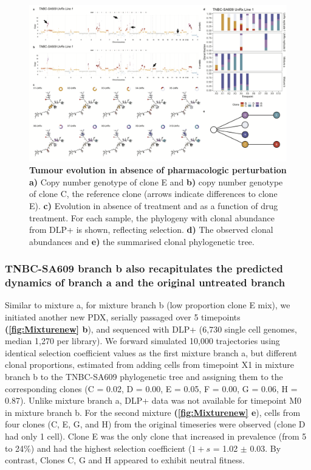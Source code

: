 \begin{figure}
\centering
\includegraphics[width=\textwidth]{Figures/chap4/genePlotsa609mix.png}
	
\caption[Tumour evolution in absence of pharmacologic perturbation]
	{\small
	\textbf{Tumour evolution in absence of pharmacologic perturbation}
	    \textbf{a)} Copy number genotype of clone E and \textbf{b)} copy number genotype of clone C, the reference clone (arrows indicate differences to clone E).  
	    \textbf{c)} Evolution in absence of treatment and as a function of drug treatment. For each sample, the phylogeny with clonal abundance from DLP+ is shown, reflecting selection. \textbf{d)} The observed clonal abundances and \textbf{e)} the summarised clonal phylogenetic tree.}
	\label{fig:genotype609mix}
\end{figure}


\subsubsection{TNBC-SA609 branch b also recapitulates the predicted dynamics of branch a and the original untreated branch}

Similar to mixture a, for mixture branch b (low proportion clone E mix), we initiated another new PDX, serially passaged over 5 timepoints \textbf{(\autoref{fig:Mixturenew} b}), and sequenced with DLP+  (6,730 single cell genomes, median 1,270 per library).
We forward simulated 10,000 trajectories using identical selection coefficient values as the first mixture branch a, but different clonal proportions, estimated from adding cells from timepoint X1 in mixture branch b to the TNBC-SA609 phylogenetic tree and assigning them to the corresponding clones (C = 0.02, D = 0.00, E = 0.05, F = 0.00, G = 0.06, H = 0.87). Unlike mixture branch a, DLP+ data was not available for timepoint M0 in mixture branch b.
For the second mixture \textbf{(\autoref{fig:Mixturenew} e}), cells from four clones (C, E, G, and H) from the original timeseries were observed (clone D had only  1 cell). Clone E was the only clone that increased in prevalence (from 5 to 24\%) and had the highest selection coefficient ($1 + s$ = 1.02 $\pm$ 0.03.  By contrast, Clones C, G and H appeared to exhibit neutral fitness. 

